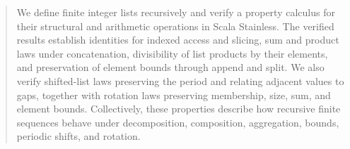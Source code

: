 \begin{abstract}
We define finite integer lists recursively and verify a property calculus
for their structural and arithmetic operations in Scala Stainless. The
verified results establish identities for indexed access and slicing, sum
and product laws under concatenation, divisibility of list products by
their elements, and preservation of element bounds through append and
split. We also verify shifted-list laws preserving the period and relating
adjacent values to gaps, together with rotation laws preserving
membership, size, sum, and element bounds. Collectively, these properties
describe how recursive finite sequences behave under decomposition,
composition, aggregation, bounds, periodic shifts, and rotation.
\end{abstract}
